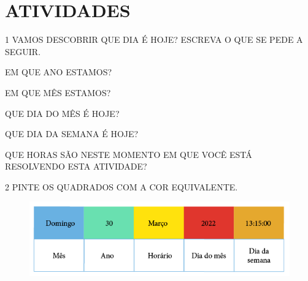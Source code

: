 \pagebreak
\section*{ATIVIDADES}

\num{1} VAMOS DESCOBRIR QUE DIA É HOJE? ESCREVA O QUE SE PEDE A SEGUIR.

\begin{escolha}
\item EM QUE ANO ESTAMOS?


\item EM QUE MÊS ESTAMOS?


\item QUE DIA DO MÊS É HOJE?


\item QUE DIA DA SEMANA É HOJE?


\item QUE HORAS SÃO NESTE MOMENTO EM QUE VOCÊ ESTÁ RESOLVENDO ESTA ATIVIDADE?

\end{escolha}



\num{2} PINTE OS QUADRADOS COM A COR EQUIVALENTE.

\begin{figure}[htpb!]
\centering
\includegraphics[width=\textwidth]{./media/SAEB_1ANO_MAT_FIGURA49.png}
\end{figure}

